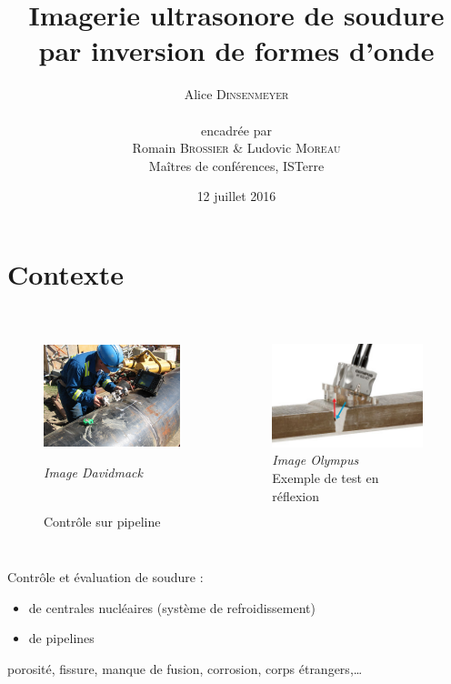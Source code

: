 \documentclass[10pt,xcolor=x11names,compress, notes=show]{beamer}%
\author{Alice \textsc{Dinsenmeyer} \\~\\ encadrée par\\ Romain \textsc{Brossier} \& Ludovic \textsc{Moreau} \\ Maîtres de conférences, ISTerre}
\title{Imagerie ultrasonore de soudure\\par inversion de formes d'onde}
\subtitle{}
\date{\small 12 juillet 2016}
\begin{document}
\begin{frame}
	\titlepage 
\end{frame}


\section{Contexte}

\subsection*{}
\begin{frame}{\insertsectionhead}
\vspace{-0.7cm}
		\begin{columns}
			\centering
			\begin{figure}
				\includegraphics[height=3cm]{img/us_test.jpg}\\
				{\tiny{\raggedright \itshape Image Davidmack}\\ \centering \scriptsize{Contrôle sur pipeline}}
			\end{figure}		
			\begin{figure}
				\includegraphics[height=3cm]{img/olympus.jpg}\\
				 {\tiny{\itshape Image Olympus}\\ \centering			\scriptsize{Exemple de test en réflexion}}
			\end{figure}
		\end{columns}	
		\vspace{0.6cm}	

			Contrôle et évaluation de soudure :\\
			\begin{itemize}
				\item de centrales nucléaires (système de refroidissement)
				\item de pipelines 
			\end{itemize}
			\vspace{0.6cm}
 			\indent {} porosité, fissure, manque de fusion, corrosion, corps étrangers,\ldots
\end{frame}
\end{document}
